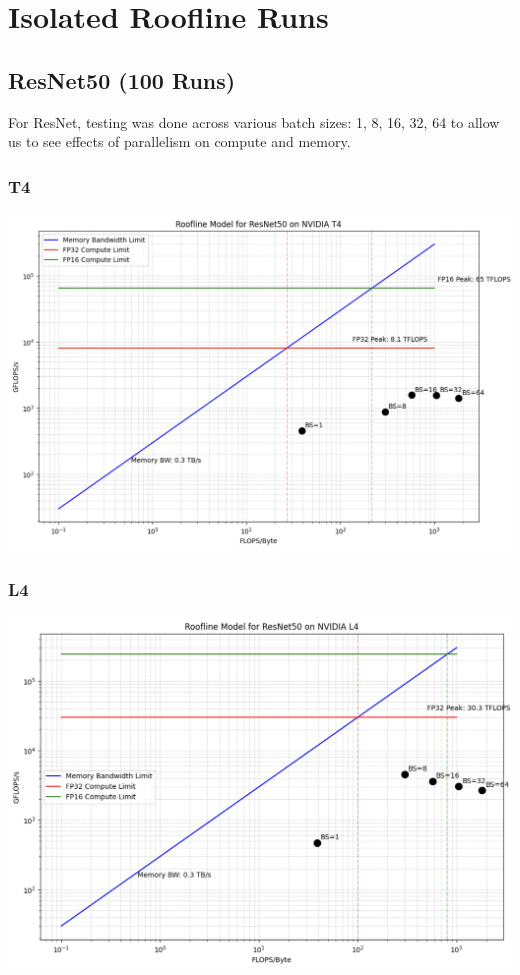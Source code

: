 \documentclass[11pt]{article}
\begin{document}
\section*{Isolated Roofline Runs}
\subsection*{ResNet50 (100 Runs)}
For ResNet, testing was done across various batch sizes: 1, 8, 16, 32, 64 to allow us to see effects of parallelism on compute and memory.
\subsubsection*{T4}
\includegraphics[width=14cm]{resnet/resnet_t4.png}
\subsubsection*{L4}
\includegraphics[width=14cm]{resnet/resnet_l4.png}
\end{document}

